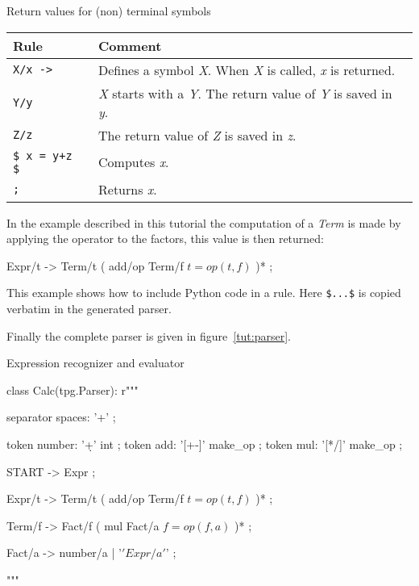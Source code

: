 \begin{tableau}
\caption{Return values for (non) terminal symbols}          \label{tut:ret_val}
\begin{tabular}{| l | p{9cm} |}
\hline
    Rule & Comment \\
\hline
    \verb!X/x ->!           & Defines a symbol \emph{X}. When \emph{X} is called, \emph{x} is returned. \\
    \verb!Y/y!              & \emph{X} starts with a \emph{Y}. The return value of \emph{Y} is saved in \emph{y}. \\
    \verb!Z/z!              & The return value of \emph{Z} is saved in \emph{z}. \\
    \verb!$ x = y+z $!      & Computes \emph{x}. \\
    \verb!;!                & Returns \emph{x}. \\
\hline
\end{tabular}
\end{tableau}

In the example described in this tutorial the computation of a \emph{Term} is made by applying the operator to the factors, this value is then returned:

\begin{verbatimtab}[4]
    Expr/t -> Term/t ( add/op Term/f $t=op(t,f)$ )* ;
\end{verbatimtab}

This example shows how to include Python code in a rule. Here \verb!$...$! is copied verbatim in the generated parser.

Finally the complete parser is given in figure~\ref{tut:parser}.

\begin{code}
\caption{Expression recognizer and evaluator}               \label{tut:parser}
\begin{verbatimtab}[4]
class Calc(tpg.Parser):
    r"""

    separator spaces: '\s+' ;

    token number: '\d+' int ;
    token add: '[+-]' make_op ;
    token mul: '[*/]' make_op ;

    START -> Expr ;

    Expr/t -> Term/t ( add/op Term/f $t=op(t,f)$ )* ;

    Term/f -> Fact/f ( mul Fact/a $f=op(f,a)$ )* ;

    Fact/a -> number/a | '\(' Expr/a '\)' ;

    """
\end{verbatimtab}
\end{code}

